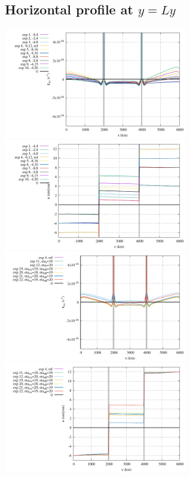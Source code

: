 \newpage

\subsection*{Horizontal profile at $y=Ly$}

\begin{center}
\includegraphics[width=8cm]{python_codes/fieldstone_148/results/fig1_exx_surface}
\includegraphics[width=8cm]{python_codes/fieldstone_148/results/fig1_u_surface}\\
\includegraphics[width=8cm]{python_codes/fieldstone_148/results/fig2_exx_surface}
\includegraphics[width=8cm]{python_codes/fieldstone_148/results/fig2_u_surface}\\

\end{center}
